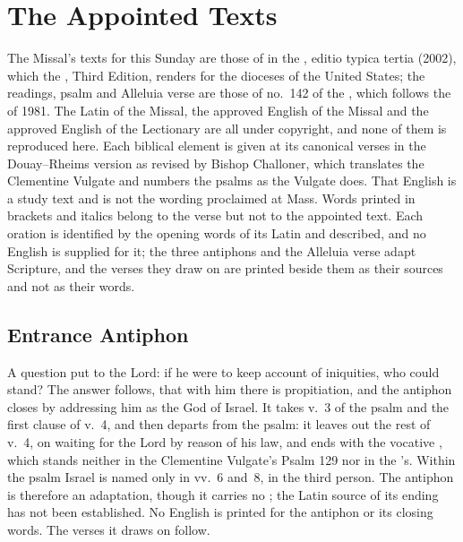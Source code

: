 \section{The Appointed Texts}
\label{sec:appointed-texts}

The Missal's texts for this Sunday are those of  in the , editio typica tertia (2002), which the
, Third Edition, renders for the dioceses of the United
States; the readings, psalm and Alleluia verse are those of no.~142 of the
, which follows the  of
1981. The Latin of the Missal, the approved English of the Missal and the
approved English of the Lectionary are all under copyright, and none of them
is reproduced here. Each biblical element is given at its canonical verses in
the Douay--Rheims version as revised by Bishop Challoner, which translates the
Clementine Vulgate and numbers the psalms as the Vulgate does. That English is
a study text and is not the wording proclaimed at Mass. Words printed in
brackets and italics belong to the verse but not to the appointed text. Each
oration is identified by the opening words of its Latin and described, and no
English is supplied for it; the three antiphons and the Alleluia verse adapt
Scripture, and the verses they draw on are printed beside them as their
sources and not as their words.

\subsection{Entrance Antiphon}
\label{proper-entrance-antiphon}


\noindent A question put to the Lord: if he were to keep account of
iniquities, who could stand? The answer follows, that with him there is
propitiation, and the antiphon closes by addressing him as the God of Israel.
It takes v.~3 of the psalm and the first clause of v.~4, and then departs from
the psalm: it leaves out the rest of v.~4, on waiting for the Lord by reason of
his law, and ends with the vocative , which stands neither in
the Clementine Vulgate's Psalm 129 nor in the 's. Within the
psalm Israel is named only in vv.~6 and~8, in the third person. The antiphon is
therefore an adaptation, though it carries no ; the Latin source of
its ending has not been established. No English is printed for the antiphon or
its closing words. The verses it draws on follow.

